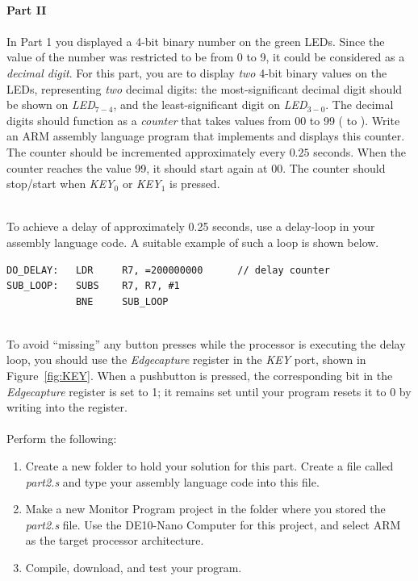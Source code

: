 \documentclass[epsfig,10pt,fullpage]{article}
\begin{document}
~\\
\noindent
{\bf Part II}
~\\
~\\
\noindent
In Part 1 you displayed a 4-bit binary number on the green LEDs. Since the value of the number was
restricted to be from 0 to 9, it could be considered as a {\it decimal digit}. For this part, 
you are to display {\it two} 4-bit binary values on the LEDs, representing {\it two} decimal digits:
the most-significant decimal digit should be shown on {\it LED}$_{7-4}$, and the least-significant
digit on {\it LED}$_{3-0}$. The decimal digits should function as a {\it counter} that takes
values from 00 to 99 ( to ). 
Write an ARM assembly language program that implements and displays
this counter. The counter should be incremented approximately every $0.25$ seconds. When the 
counter reaches the value 99, it should start again at 00. The counter should stop/start 
when {\it KEY}$_0$ or {\it KEY}$_1$ is pressed.

~\\
\noindent
To achieve a delay of approximately 0.25 seconds, use a delay-loop in your assembly language
code. A suitable example of such a loop is shown below.

\begin{minipage}[t]{12.5 cm}
\begin{lstlisting}[style=defaultArmStyle]
DO_DELAY: 	LDR		R7, =200000000 		// delay counter
SUB_LOOP: 	SUBS	R7, R7, #1
			BNE 	SUB_LOOP
\end{lstlisting}
\end{minipage}

~\\
\noindent
To avoid ``missing'' any button presses while the processor is executing the delay loop, you
should use the {\it Edgecapture} register in the {\it KEY} port, shown in Figure~\ref{fig:KEY}.
When a pushbutton is pressed, the corresponding bit in the {\it Edgecapture} register is
set to 1; it remains set until your program resets it to 0 by writing into the register.
~\\
~\\
\noindent
Perform the following:

\begin{enumerate}
\item Create a new folder to hold your solution for this part. Create a
file called {\it part2.s} and type your assembly language code into this file.

\item
Make a new Monitor Program project in the folder where you stored the {\it part2.s}
file. Use the DE10-Nano Computer for this project, and select ARM as the target
processor architecture.

\item
Compile, download, and test your program. 
\end{enumerate}
\end{document}
